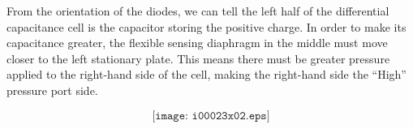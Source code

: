 From the orientation of the diodes, we can tell the left half of the differential capacitance cell is the capacitor storing the positive charge.  In order to make its capacitance greater, the flexible sensing diaphragm in the middle must move closer to the left stationary plate.  This means there must be greater pressure applied to the right-hand side of the cell, making the right-hand side the ``High'' pressure port side.

$$\texttt{[image: i00023x02.eps]}$$






